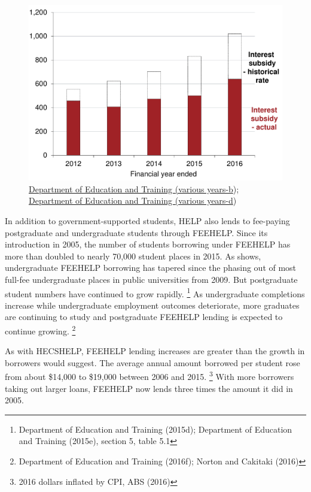 \documentclass[embargoed]{grattan}
\begin{document}
{\begin{figure}
\includegraphics[page=5]{atlas/Chartpack.pdf}
%
{\protect\hyperlink{_ENREF_36}{Department of Education and Training (various years-b}); \protect\hyperlink{_ENREF_38}{Department of Education and Training (various years-d})}
\end{figure}

In addition to government-supported students, \gls{HELP} also lends to fee-paying postgraduate and undergraduate students through \gls{FEEHELP}.
Since its introduction in 2005, the number of students borrowing under \gls{FEEHELP} has more than doubled to nearly 70,000 student places in 2015.
As  shows, undergraduate \gls{FEEHELP} borrowing has tapered since the phasing out of most full-fee undergraduate places in public universities from 2009.
But postgraduate student numbers have continued to grow rapidly.%
\footnote{Department of Education and Training (2015d); Department of Education and Training (2015e), section 5, table 5.1} As undergraduate completions increase while undergraduate employment outcomes deteriorate, more graduates are continuing to study and postgraduate \gls{FEEHELP} lending is expected to continue growing.%
\footnote{Department of Education and Training (2016f); Norton and Cakitaki (2016)}

As with \gls{HECSHELP}, \gls{FEEHELP} lending increases are greater than the growth in borrowers would suggest.
The average annual amount borrowed per student rose from about \$14,000 to \$19,000 between 2006 and 2015.%
\footnote{2016 dollars inflated by \gls{CPI}, ABS (2016)} With more borrowers taking out larger loans, \gls{FEEHELP} now lends three times the amount it did in 2005.

}
\end{document}
